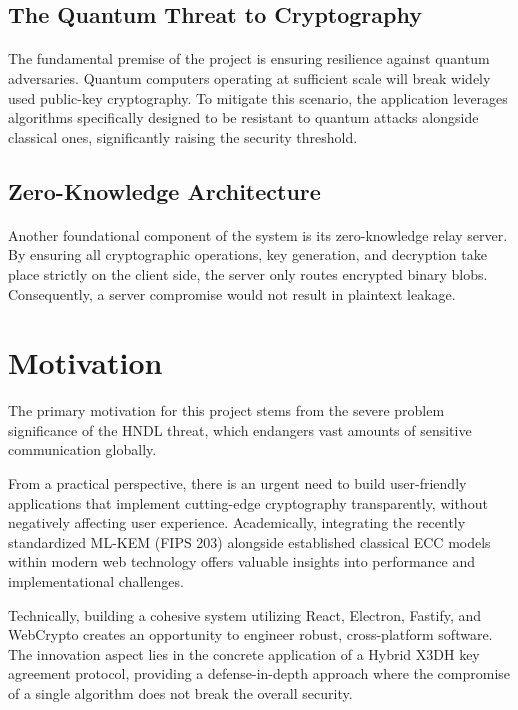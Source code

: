 \subsection{The Quantum Threat to Cryptography}
\paragraph{} The fundamental premise of the project is ensuring resilience against quantum adversaries. Quantum computers operating at sufficient scale will break widely used public-key cryptography. To mitigate this scenario, the application leverages algorithms specifically designed to be resistant to quantum attacks alongside classical ones, significantly raising the security threshold.

\subsection{Zero-Knowledge Architecture}
\paragraph{} Another foundational component of the system is its zero-knowledge relay server. By ensuring all cryptographic operations, key generation, and decryption take place strictly on the client side, the server only routes encrypted binary blobs. Consequently, a server compromise would not result in plaintext leakage.

\section{Motivation}
The primary motivation for this project stems from the severe problem significance of the HNDL threat, which endangers vast amounts of sensitive communication globally. 

From a practical perspective, there is an urgent need to build user-friendly applications that implement cutting-edge cryptography transparently, without negatively affecting user experience. Academically, integrating the recently standardized ML-KEM (FIPS 203) alongside established classical ECC models within modern web technology offers valuable insights into performance and implementational challenges.

Technically, building a cohesive system utilizing React, Electron, Fastify, and WebCrypto creates an opportunity to engineer robust, cross-platform software. The innovation aspect lies in the concrete application of a Hybrid X3DH key agreement protocol, providing a defense-in-depth approach where the compromise of a single algorithm does not break the overall security.

